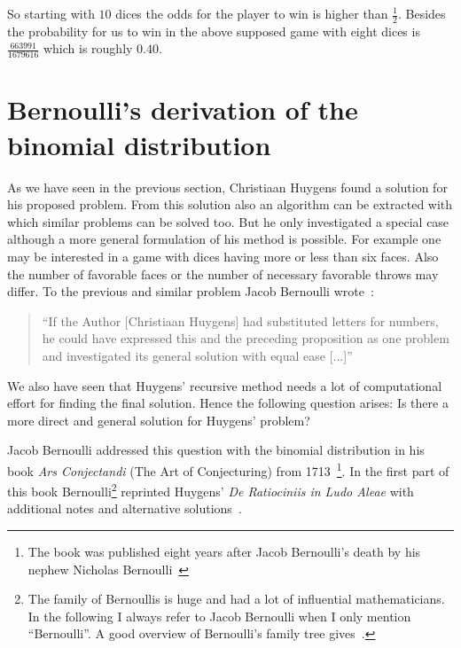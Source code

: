 So starting with $10$ dices the odds for the player to win is higher than $\tfrac 12$. Besides the probability for us to win in the above supposed game with eight dices is $\tfrac{663991}{1679616}$ which is roughly $0.40$.

\section{Bernoulli's derivation of the binomial distribution}


As we have seen in the previous section, Christiaan Huygens found a solution for his proposed problem. From this solution also an algorithm can be extracted with which similar problems can be solved too. But he only investigated a special case although a more general formulation of his method is possible. For example one may be interested in a game with dices having more or less than six faces. Also the number of favorable faces or the number of necessary favorable throws may differ. To the previous and similar problem Jacob Bernoulli wrote~\cite[p. 157]{bernoulli}:

\begin{quote}
  ``If the Author [Christiaan Huygens] had substituted letters for numbers, he could have expressed this and the preceding proposition as one problem and investigated its general solution with equal ease [...]''
\end{quote}

We also have seen that Huygens' recursive method needs a lot of computational effort for finding the final solution. Hence the following question arises: Is there a more direct and general solution for Huygens' problem?


Jacob Bernoulli addressed this question with the binomial distribution in his book \emph{Ars Conjectandi} (The Art of Conjecturing) from 1713~\cite[pp. 220-256]{hald1}\footnote{The book was published eight years after Jacob Bernoulli's death by his nephew Nicholas Bernoulli~\cite[pp. 223-224]{hald1}}. In the first part of this book Bernoulli\footnote{The family of Bernoullis is huge and had a lot of influential mathematicians. In the following I always refer to Jacob Bernoulli when I only mention ``Bernoulli''. A good overview of Bernoulli's family tree gives~\cite[pp. 1-4]{bernoulli}.} reprinted Huygens' \emph{De Ratiociniis in Ludo Aleae} with additional notes and alternative solutions~\cite[p. 63]{bernoulli}.

